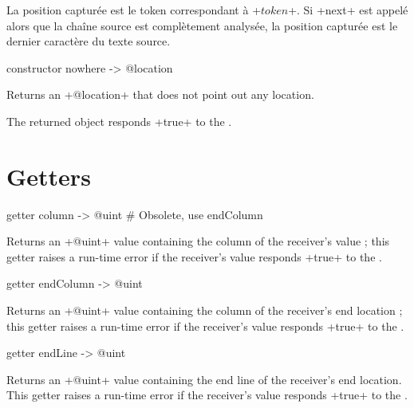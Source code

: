 La position capturée est le token correspondant à \ggst+$token$+. Si \ggst+next+ est appelé alors que la chaîne source est complètement analysée, la position capturée est le dernier caractère du texte source.







\begin{galgas3}
constructor nowhere -> @location
\end{galgas3}


Returns an \ggst+@location+ that does not point out any location.

The returned object responds \ggst+true+ to the .





\section{Getters}



\begin{galgas3}
getter column -> @uint # Obsolete, use endColumn
\end{galgas3}

Returns an \ggst+@uint+ value containing the column of the receiver's value ; this getter raises a run-time error if the receiver's value responds \ggst+true+ to the .


\begin{galgas3}
getter endColumn -> @uint
\end{galgas3}

Returns an \ggst+@uint+ value containing the column of the receiver's end location ; this getter raises a run-time error if the receiver's value responds \ggst+true+ to the .



\begin{galgas3}
getter endLine -> @uint
\end{galgas3}

Returns an \ggst+@uint+ value containing the end line of the receiver's end location. This getter raises a run-time error if the receiver's value responds \ggst+true+ to the .


